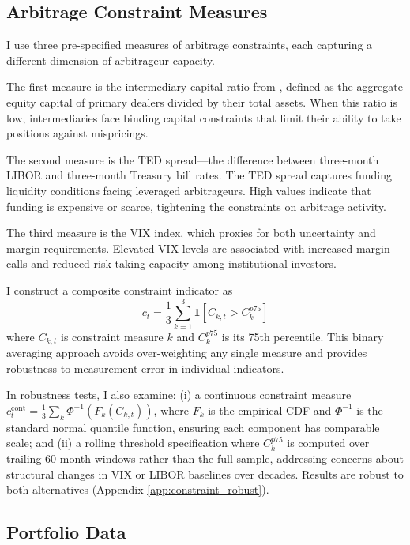 \documentclass[12pt,letterpaper]{article}
\theoremstyle{plain}
\theoremstyle{definition}
\begin{document}
\subsection{Arbitrage Constraint Measures}\label{subsec:constraint_data}

I use three pre-specified measures of arbitrage constraints, each capturing a different dimension of arbitrageur capacity.

The first measure is the intermediary capital ratio from \cite{he2017intermediary}, defined as the aggregate equity capital of primary dealers divided by their total assets. When this ratio is low, intermediaries face binding capital constraints that limit their ability to take positions against mispricings.

The second measure is the TED spread---the difference between three-month LIBOR and three-month Treasury bill rates. The TED spread captures funding liquidity conditions facing leveraged arbitrageurs. High values indicate that funding is expensive or scarce, tightening the constraints on arbitrage activity.

The third measure is the VIX index, which proxies for both uncertainty and margin requirements. Elevated VIX levels are associated with increased margin calls and reduced risk-taking capacity among institutional investors.

I construct a composite constraint indicator as
\begin{equation}\label{eq:constraint_indicator}
c_t = \frac{1}{3}\sum_{k=1}^{3} \mathbf{1}[C_{k,t} > C_k^{p75}]
\end{equation}
where $C_{k,t}$ is constraint measure $k$ and $C_k^{p75}$ is its 75th percentile. This binary averaging approach avoids over-weighting any single measure and provides robustness to measurement error in individual indicators.

In robustness tests, I also examine: (i) a continuous constraint measure $c_t^{\text{cont}} = \frac{1}{3}\sum_k \Phi^{-1}(F_k(C_{k,t}))$, where $F_k$ is the empirical CDF and $\Phi^{-1}$ is the standard normal quantile function, ensuring each component has comparable scale; and (ii) a rolling threshold specification where $C_k^{p75}$ is computed over trailing 60-month windows rather than the full sample, addressing concerns about structural changes in VIX or LIBOR baselines over decades. Results are robust to both alternatives (Appendix \ref{app:constraint_robust}).

\subsection{Portfolio Data}\label{subsec:portfolio_data}
\end{document}
